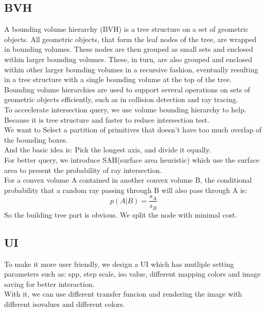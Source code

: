 \documentclass[acmtog]{acmart}
\begin{document}
\subsection{BVH}
A bounding volume hierarchy (BVH) is a tree structure on a set of geometric objects. 
All geometric objects, that form the leaf nodes of the tree, are wrapped in bounding 
volumes. These nodes are then grouped as small sets and enclosed within larger bounding 
volumes. These, in turn, are also grouped and enclosed within other larger bounding volumes 
in a recursive fashion, eventually resulting in a tree structure with a single bounding 
volume at the top of the tree. Bounding volume hierarchies are used to support several 
operations on sets of geometric objects efficiently, such as in collision detection and 
ray tracing.\\

To acceclerate intersection query, we use volume bounding hierarchy 
to help. Because it is tree structure and faster to reduce intersection test.\\
We want to Select a partition of primitives that doesn't have too
much overlap of the bounding boxes.\\
And the basic idea is: Pick the longest axis, and divide it equally.\\

For better query, we introduce SAH(surface area heuristic) which use the surface area to 
present the probability of ray intersection. \\
For a convex volume A contained in another convex volume
B, the conditional probability that a random ray passing
through B will also pass through A is:
$$p(A|B)=\frac{s_A}{s_B}$$
So the building tree part is obvious. We split the node with minimal cost.\\


\subsection{UI}
To make it more user friendly, we design a UI which has mutliple setting parameters such as: 
spp, step scale, iso value, different mapping colors and image saving for better interaction.\\
With it, we can use different transfer funcion and rendering the image with different isovalues 
and different colors.
\end{document}
